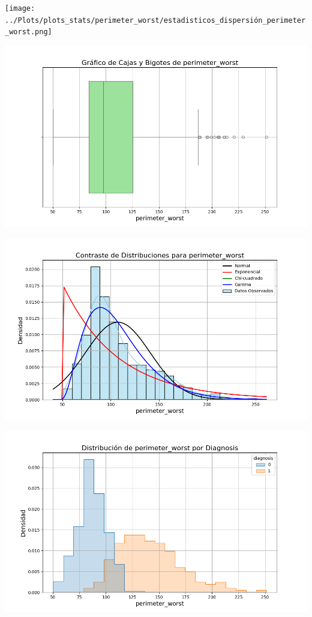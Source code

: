 \documentclass[a4paper, 12pt]{article}
\begin{document}
\texttt{[image: ../Plots/plots\_stats/perimeter\_worst/estadisticos\_dispersión\_perimeter\_worst.png]}



\includegraphics[width=\textwidth]{../Plots/plots_stats/perimeter_worst/boxplot_perimeter_worst.png}




\includegraphics[width=\textwidth]{../Plots/plots_stats/perimeter_worst/distribuciones_conocidas_perimeter_worst.png}

\includegraphics[width=\textwidth]{../Plots/plots_diagnosis/distribucion_perimeter_worst_por_diagnosis.png}
\end{document}
